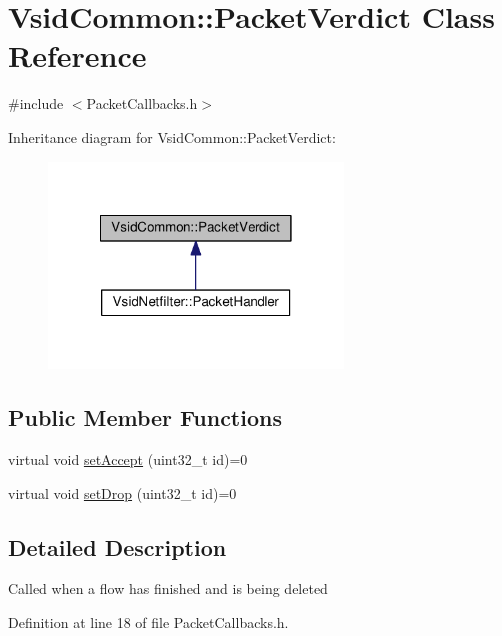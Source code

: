 \hypertarget{class_vsid_common_1_1_packet_verdict}{\section{Vsid\-Common\-:\-:Packet\-Verdict Class Reference}
\label{class_vsid_common_1_1_packet_verdict}
}


{\ttfamily \#include $<$Packet\-Callbacks.\-h$>$}



Inheritance diagram for Vsid\-Common\-:\-:Packet\-Verdict\-:
\nopagebreak
\begin{figure}[H]
\begin{center}
\leavevmode
\includegraphics[width=222pt]{class_vsid_common_1_1_packet_verdict__inherit__graph}
\end{center}
\end{figure}
\subsection*{Public Member Functions}
\begin{DoxyCompactItemize}
\item 
virtual void \hyperlink{class_vsid_common_1_1_packet_verdict_a65a14cfba9da80f91e06feb1e12bde0d}{set\-Accept} (uint32\-\_\-t id)=0
\item 
virtual void \hyperlink{class_vsid_common_1_1_packet_verdict_ad695769962d16d5e76c95f8e569c8b6b}{set\-Drop} (uint32\-\_\-t id)=0
\end{DoxyCompactItemize}


\subsection{Detailed Description}
Called when a flow has finished and is being deleted 

Definition at line 18 of file Packet\-Callbacks.\-h.



